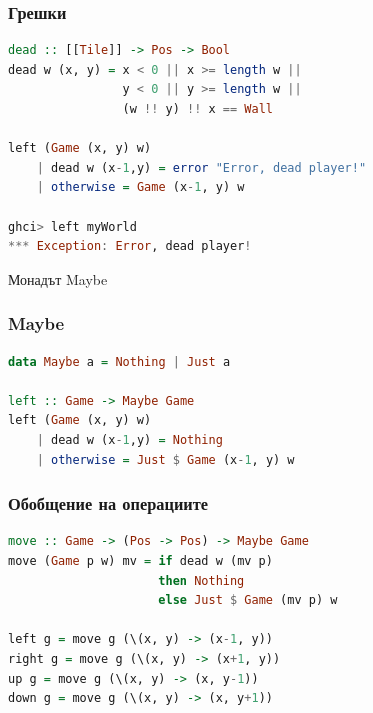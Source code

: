 \documentclass{beamer}
\begin{document}
\begin{frame}[fragile]
  \frametitle{Грешки}

\begin{lstlisting}[basicstyle=\small,language=Haskell]
dead :: [[Tile]] -> Pos -> Bool
dead w (x, y) = x < 0 || x >= length w ||
                y < 0 || y >= length w || 
                (w !! y) !! x == Wall

left (Game (x, y) w) 
    | dead w (x-1,y) = error "Error, dead player!"
    | otherwise = Game (x-1, y) w

ghci> left myWorld 
*** Exception: Error, dead player!
\end{lstlisting}



\end{frame}

\begin{frame}
  \centerline{Монадът Maybe}
\end{frame}


\begin{frame}[fragile]
  \frametitle{Maybe}

\begin{lstlisting}[basicstyle=\small,language=Haskell]
data Maybe a = Nothing | Just a

left :: Game -> Maybe Game
left (Game (x, y) w) 
    | dead w (x-1,y) = Nothing
    | otherwise = Just $ Game (x-1, y) w

\end{lstlisting}

\end{frame}


\begin{frame}[fragile]
  \frametitle{Обобщение на операциите}

\begin{lstlisting}[basicstyle=\small,language=Haskell]
move :: Game -> (Pos -> Pos) -> Maybe Game
move (Game p w) mv = if dead w (mv p) 
                     then Nothing 
                     else Just $ Game (mv p) w

left g = move g (\(x, y) -> (x-1, y))
right g = move g (\(x, y) -> (x+1, y))
up g = move g (\(x, y) -> (x, y-1))
down g = move g (\(x, y) -> (x, y+1))
\end{lstlisting}

\end{frame}
\end{document}
